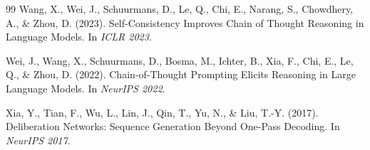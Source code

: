 \begin{thebibliography}{99}
Wang, X., Wei, J., Schuurmans, D., Le, Q., Chi, E., Narang, S., Chowdhery, A., \& Zhou, D. (2023).
\newblock Self-Consistency Improves Chain of Thought Reasoning in Language Models.
\newblock In \emph{ICLR 2023}.

Wei, J., Wang, X., Schuurmans, D., Bosma, M., Ichter, B., Xia, F., Chi, E., Le, Q., \& Zhou, D. (2022).
\newblock Chain-of-Thought Prompting Elicits Reasoning in Large Language Models.
\newblock In \emph{NeurIPS 2022}.

Xia, Y., Tian, F., Wu, L., Lin, J., Qin, T., Yu, N., \& Liu, T.-Y. (2017).
\newblock Deliberation Networks: Sequence Generation Beyond One-Pass Decoding.
\newblock In \emph{NeurIPS 2017}.

\end{thebibliography}